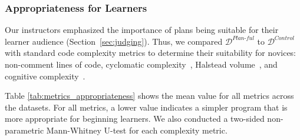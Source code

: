 \subsubsection{Appropriateness for Learners}
\label{sec:quant_learners_appropriateness}

Our instructors emphasized the importance of plans being suitable for their learner audience (Section~\ref{sec:judging}). Thus, we compared \(\mathcal{D}^{\textit{Plan-ful}}\) to \(\mathcal{D}^{\textit{Control}}\) with standard code complexity metrics
to determine their suitability for novices: non-comment lines of code, cyclomatic complexity~\cite{cyclomatic_complexity_mccabe}, Halstead volume~\cite{halstead_metrics}, and cognitive complexity~\cite{cognitive_complexity_Campbell}.



Table \ref{tab:metrics_appropriateness} shows the mean value for all metrics across the datasets. For all metrics, a lower value indicates a simpler program that is more appropriate for beginning learners. We also conducted a two-sided non-parametric Mann-Whitney U-test for each complexity metric.

